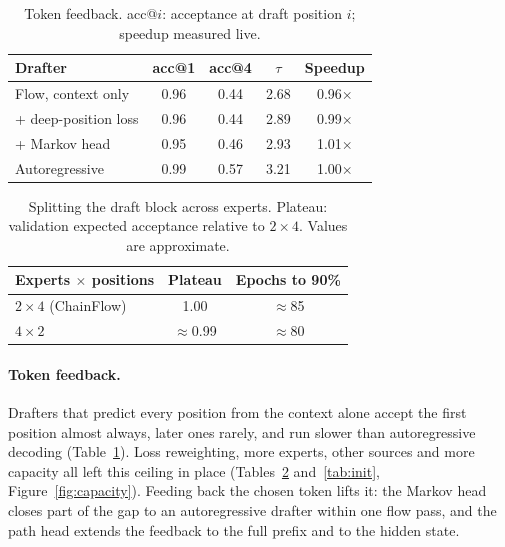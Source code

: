 \documentclass{article}
\newcommand{\Sys}{ChainFlow\xspace}
\begin{document}
\begin{table}[!htbp]
\centering\small
\setlength{\tabcolsep}{4pt}
\caption{Token feedback. acc@$i$: acceptance at draft
position $i$; speedup measured live.}
\label{tab:feedback}
\vskip 0.1in
\begin{tabular}{lcccc}
\toprule
Drafter & acc@1 & acc@4 & $\tau$ & Speedup \\
\midrule
Flow, context only          & 0.96 & 0.44 & 2.68 & 0.96$\times$ \\
\quad + deep-position loss   & 0.96 & 0.44 & 2.89 & 0.99$\times$ \\
\quad + Markov head          & 0.95 & 0.46 & 2.93 & 1.01$\times$ \\
Autoregressive & 0.99 & 0.57 & 3.21 & 1.00$\times$ \\
\bottomrule
\end{tabular}


\end{table}


\begin{table}[!htbp]
\centering\small
\setlength{\tabcolsep}{4.5pt}
\caption{Splitting the draft block across experts.
Plateau: validation expected acceptance relative to $2\times4$.
Values are approximate.}
\label{tab:experts}
\vskip 0.1in
\begin{tabular}{lcc}
\toprule
Experts $\times$ positions & Plateau & Epochs to 90\% \\
\midrule
$2\times4$ (\Sys) & 1.00 & $\approx$85 \\
$4\times2$        & $\approx$0.99 & $\approx$80 \\
\bottomrule
\end{tabular}


\end{table}

\paragraph{Token feedback.}
Drafters that predict every position from the context alone accept the first
position almost always, later ones rarely, and run slower than
autoregressive decoding (Table~\ref{tab:feedback}). Loss reweighting, more
experts, other sources and more capacity all left this ceiling in place
(Tables~\ref{tab:experts} and~\ref{tab:init},
Figure~\ref{fig:capacity}). Feeding back the chosen
token lifts it: the Markov head closes part of the gap to an autoregressive
drafter within one flow pass, and the path head extends the feedback to the
full prefix and to the hidden state.
\end{document}
